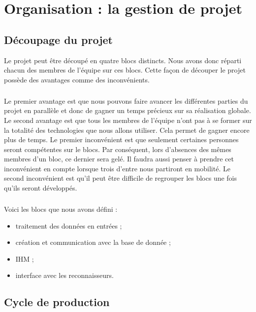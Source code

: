 \chapter{Organisation : la gestion de projet}

\section{Découpage du projet}

Le projet peut être découpé en quatre blocs distincts. Nous avons donc réparti chacun des membres de l’équipe sur ces blocs. Cette façon de découper le projet possède des avantages comme des inconvénients.

\paragraph{}

Le premier avantage est que nous pouvons faire avancer les différentes parties du projet en parallèle et donc de gagner un temps précieux sur sa réalisation globale. Le second avantage est que tous les membres de l’équipe n’ont pas à se former sur la totalité des technologies que nous allons utiliser. Cela permet de gagner encore plus de temps. Le premier inconvénient est que seulement certaines personnes seront compétentes sur le blocs. Par conséquent, lors d’absences des mêmes membres d’un bloc, ce dernier sera gelé. Il faudra aussi penser à prendre cet inconvénient en compte lorsque trois d’entre nous partiront en mobilité. Le second inconvénient est qu’il peut être difficile de regrouper les blocs une fois qu’ils seront développés.

\paragraph{}

Voici les blocs que nous avons défini :

\begin{itemize}
\item traitement des données en entrées ;
\item création et communication avec la base de donnée ;
\item IHM ;
\item interface avec les reconnaisseurs.
\end{itemize}

\section{Cycle de production}

